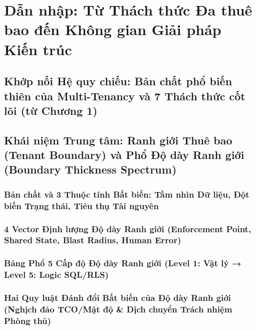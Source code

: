 \par{}
\section{Dẫn nhập: Từ Thách thức Đa thuê bao đến Không gian Giải pháp Kiến trúc}
\label{outline:2:boundaries:1}

\par{}
\subsection{Khớp nối Hệ quy chiếu: Bản chất phổ biến thiên của Multi-Tenancy và 7 Thách thức cốt lõi (từ Chương 1)}
\label{outline:2:boundaries:2}

\par{}
\subsection{Khái niệm Trung tâm: Ranh giới Thuê bao (Tenant Boundary) và Phổ Độ dày Ranh giới (Boundary Thickness Spectrum)}
\label{outline:2:boundaries:3}

\par{}
\subsubsection{Bản chất và 3 Thuộc tính Bất biến: Tầm nhìn Dữ liệu, Đột biến Trạng thái, Tiêu thụ Tài nguyên}
\label{outline:2:boundaries:4}

\par{}
\subsubsection{4 Vector Định lượng Độ dày Ranh giới (Enforcement Point, Shared State, Blast Radius, Human Error)}
\label{outline:2:boundaries:5}

\par{}
\subsubsection{Bảng Phổ 5 Cấp độ Độ dày Ranh giới (Level 1: Vật lý → Level 5: Logic SQL/RLS)}
\label{outline:2:boundaries:6}

\par{}
\subsubsection{Hai Quy luật Đánh đổi Bất biến của Độ dày Ranh giới (Nghịch đảo TCO/Mật độ \& Dịch chuyển Trách nhiệm Phòng thủ)}
\label{outline:2:boundaries:7}

